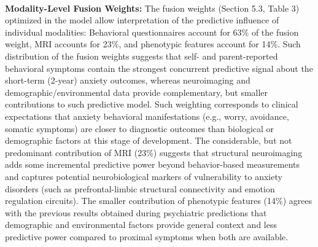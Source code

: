 \documentclass[10pt,letterpaper]{article}
\begin{document}
                                                                                                                          \\\textbf{Modality-Level Fusion Weights:} The fusion weights (Section 5.3, Table 3) optimized in the model allow interpretation of the predictive influence of individual modalities: Behavioral questionnaires account for 63\% of the fusion weight, MRI accounts for 23\%, and phenotypic features account for 14\%. Such distribution of the fusion weights suggests that self- and parent-reported behavioral symptoms contain the strongest concurrent predictive signal about the short-term (2-year) anxiety outcomes, whereas neuroimaging and demographic/environmental data provide complementary, but smaller contributions to such predictive model. Such weighting corresponds to clinical expectations that anxiety behavioral manifestations (e.g., worry, avoidance, somatic symptoms) are closer to diagnostic outcomes than biological or demographic factors at this stage of development. The considerable, but not predominant contribution of MRI (23\%) suggests that structural neuroimaging adds some incremental predictive power beyond behavior-based measurements and captures potential neurobiological markers of vulnerability to anxiety disorders (such as prefrontal-limbic structural connectivity and emotion regulation circuits). The smaller contribution of phenotypic features (14\%) agrees with the previous results obtained during psychiatric predictions that demographic and environmental factors provide general context and less predictive power compared to proximal symptoms when both are available.
\end{document}
